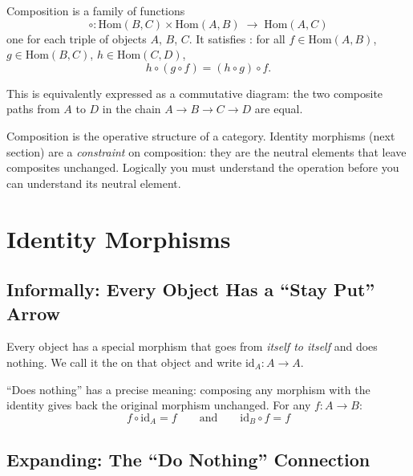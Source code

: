 Composition is a family of functions
\[
  \circ : \mathrm{Hom}(B, C) \times \mathrm{Hom}(A, B) \;\to\; \mathrm{Hom}(A, C)
\]
one for each triple of objects $A$, $B$, $C$. It satisfies :
for all $f \in \mathrm{Hom}(A,B)$, $g \in \mathrm{Hom}(B,C)$,
$h \in \mathrm{Hom}(C,D)$,
\[
  h \circ (g \circ f) = (h \circ g) \circ f.
\]

This is equivalently expressed as a commutative diagram: the two composite
paths from $A$ to $D$ in the chain $A \to B \to C \to D$ are equal.

Composition is the operative structure of a category. Identity morphisms
(next section) are a \emph{constraint} on composition: they are the neutral
elements that leave composites unchanged. Logically you must understand the
operation before you can understand its neutral element.


\section{Identity Morphisms}
\label{sec:identity}

\subsection{Informally: Every Object Has a ``Stay Put'' Arrow}

Every object has a special morphism that goes from \emph{itself to itself} and
does nothing. We call it the  on that object and write
$\mathrm{id}_A : A \to A$.

``Does nothing'' has a precise meaning: composing any morphism with the
identity gives back the original morphism unchanged. For any $f : A \to B$:
\[
  f \circ \mathrm{id}_A = f \qquad \text{and} \qquad \mathrm{id}_B \circ f = f
\]

\begin{center}
\end{center}

\subsection{Expanding: The ``Do Nothing'' Connection}

